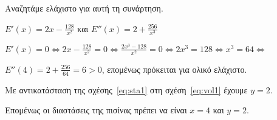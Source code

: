 \documentclass[a4paper,table]{report}
\begin{document}
\begin{solution}
  Αναζητάμε ελάχιστο για αυτή τη συνάρτηση.
  \begin{myitemize}
    \item $ E'(x) = 2x - \frac{128}{x^{2}} $ και $ E''(x) = 2 + \frac{256}{x^{3}} $
    \item $ E'(x) = 0 \Leftrightarrow 2x - \frac{128}{x^{2}} = 0
      \Leftrightarrow \frac{2x^{3} - 128}{x^{2}} = 0 \Leftrightarrow
      2x^{3} = 128 \Leftrightarrow x^{3} = 64 \Leftrightarrow$
    \item $ E''(4) = 2 + \frac{256}{64} = 6 > 0 $, επομένως πρόκειται για
      ολικό ελάχιστο.
  \end{myitemize}
  Με αντικατάσταση της σχέσης~\eqref{eq:sta1} στη σχέση~\eqref{eq:vol1} έχουμε 
  $ y = 2 $.

  Επομένως οι διαστάσεις της πισίνας πρέπει να είναι $ x = 4 $ και $ y = 2 $.
\end{solution}
\end{document}
